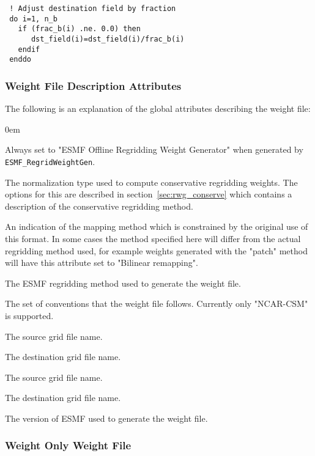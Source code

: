 \begin{verbatim}
 ! Adjust destination field by fraction
 do i=1, n_b
   if (frac_b(i) .ne. 0.0) then
      dst_field(i)=dst_field(i)/frac_b(i)
   endif
 enddo
\end{verbatim}


\subsubsection{Weight File Description Attributes}

The following is an explanation of the global attributes describing the weight file:
\begin{description}
  \itemsep0em
  \item[title] Always set to  "ESMF Offline Regridding Weight Generator" when generated by {\tt ESMF\_RegridWeightGen}.
  \item[normalization] The normalization type used to compute conservative regridding weights. The options for this are described in section~\ref{sec:rwg_conserve} which contains a description of the conservative regridding method.  
  \item[map\_method] An indication of the mapping method which is constrained by the original use of this format. In some cases the method specified here will differ from the actual regridding method used, for example weights generated with the "patch" method will have this attribute set to "Bilinear remapping". 
  \item[ESMF\_regrid\_method] The ESMF regridding method used to generate the weight file. 
  \item[conventions] The set of conventions that the weight file follows. Currently only "NCAR-CSM" is supported.
  \item[domain\_a] The source grid file name. 
  \item[domain\_b] The destination grid file name. 
  \item[grid\_file\_src] The source grid file name. 
  \item[grid\_file\_dst] The destination grid file name. 
  \item[CVS\_revision] The version of ESMF used to generate the weight file.
\end{description}

\subsubsection{Weight Only Weight File}

